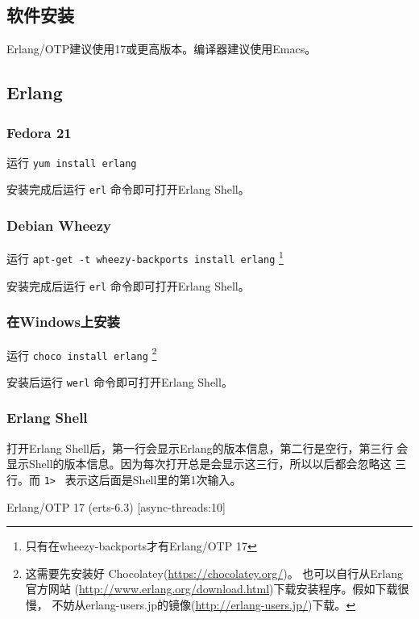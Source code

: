 \documentclass[preview,multi,crop=false,border=1in,class=memoir]{standalone}
\begin{document}
\begin{preview-page}

\section{软件安装}

Erlang/OTP建议使用17或更高版本。编译器建议使用Emacs。

\subsection{Erlang}

\subsubsection{Fedora 21}
运行 \verb|yum install erlang|

安装完成后运行 \verb|erl| 命令即可打开Erlang Shell。

\subsubsection{Debian Wheezy}
运行 \verb|apt-get -t wheezy-backports install erlang|
\footnote{只有在wheezy-backports才有Erlang/OTP 17}

安装完成后运行 \verb|erl| 命令即可打开Erlang Shell。

\subsubsection{在Windows上安装}
运行 \verb|choco install erlang|
\footnote{
这需要先安装好 Chocolatey(\url{https://chocolatey.org/})。
也可以自行从Erlang官方网站
(\url{http://www.erlang.org/download.html})下载安装程序。假如下载很慢，
不妨从erlang-users.jp的镜像(\url{http://erlang-users.jp/})下载。
}

安装后运行 \verb|werl| 命令即可打开Erlang Shell。

\subsubsection{Erlang Shell}

打开Erlang Shell后，第一行会显示Erlang的版本信息，第二行是空行，第三行
会显示Shell的版本信息。因为每次打开总是会显示这三行，所以以后都会忽略这
三行。而 \verb|1> | 表示这后面是Shell里的第1次输入。

\begin{Listing}
Erlang/OTP 17 (erts-6.3) [async-threads:10]


\end{Listing}
\end{preview-page}
\end{document}
